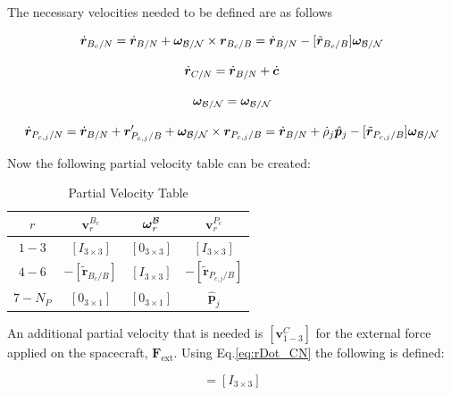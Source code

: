 The necessary velocities needed to be defined are as follows

\begin{equation}
\dot{\bm r}_{B_c/N} = \dot{\bm r}_{B/N} + \bm \omega_{\cal{B/N}} \times {\bm r}_{B_c/B} = \dot{\bm r}_{B/N}  - [\tilde{{\bm r}}_{B_c/B}] \bm \omega_{\cal{B/N}} \\
\end{equation}

\begin{equation}
	\dot{\bm r}_{C/N} = \dot{\bm r}_{B/N} + \dot{\bm c}\\
	\label{eq:rDot_CN}
\end{equation}

\begin{equation}
	\bm \omega_{\cal{B/N}} = \bm \omega_{\cal{B/N}}
\end{equation}

\begin{equation}
	\dot{\bm r}_{P_{c,j}/N} = \dot{\bm r}_{B/N} + {\bm r}'_{P_{c,j}/B} + \bm \omega_{\cal{B/N}} \times {\bm r}_{P_{c,j}/B} = \dot{\bm r}_{B/N} + \dot{\rho}_j \hat{\bm p}_j  - [\tilde{{\bm r}}_{P_{c,j}/B}] \bm \omega_{\cal{B/N}}
\end{equation}

Now the following partial velocity table can be created:

\begin{table}[htbp]
	\caption{Partial Velocity Table}
	\label{tab:hub}
	\centering \fontsize{10}{10}\selectfont
	\begin{tabular}{ c | c | c | c } %
		\hline
		$r$  & $\bm v^{B_c}_{r}$  & $\bm \omega_{\textit{r}}^{\cal{B}}$ & $\bm v^{P_c}_{r}$ \\
		\hline
		$1-3$  & $[I_{3\times 3}]$ & $[0_{3\times 3}]$ & $[I_{3\times 3}]$ \\
		$4-6$ & $- [\tilde{{\bm r}}_{B_c/B}]$ & $[I_{3\times 3}]$ & $- [\tilde{{\bm r}}_{P_{c,j}/B}]$ \\
		$7-{N_P}$ &$[0_{3\times 1}]$ & $[0_{3\times 1}]$ & $\hat{\bm p}_j$ \\
		\hline
	\end{tabular}
\end{table}

An additional partial velocity that is needed is $[\bm v^C_{1-3}]$ for the external force applied on the spacecraft, $\bm F_{\text{ext}}$. Using Eq.\eqref{eq:rDot_CN} the following is defined:

\begin{equation}
	[\bm v^C_{1-3}] = [I_{3\times 3}]
\end{equation}

